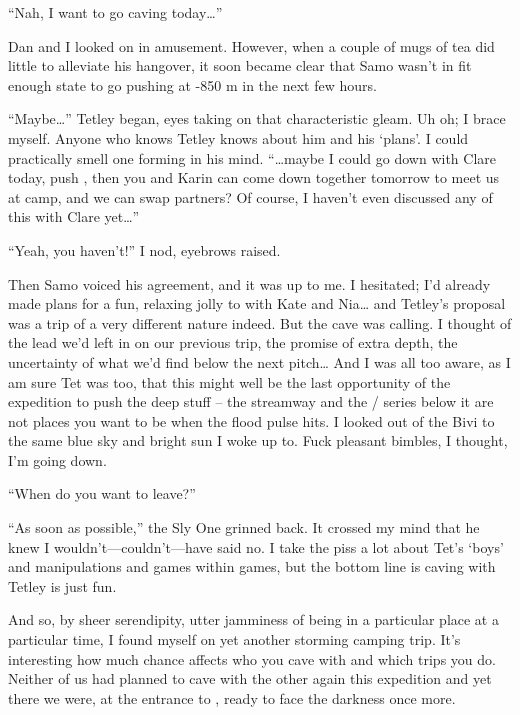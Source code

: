``Nah, I want to go caving today\ldots{}''

Dan and I looked on in amusement. However, when a couple of mugs of tea
did little to alleviate his hangover, it soon became clear that Samo
wasn't in fit enough state to go pushing at -850 m in the next few
hours.

``Maybe\ldots{}'' Tetley began, eyes taking on that characteristic
gleam. Uh oh; I brace myself. Anyone who knows Tetley knows about him
and his `plans'. I could practically smell one forming in his mind.
``\ldots{}maybe I could go down with Clare today, push
, then you and Karin can come down together tomorrow
to meet us at camp, and we can swap partners? Of course, I haven't even
discussed any of this with Clare yet\ldots{}''

``Yeah, you haven't!'' I nod, eyebrows raised.

Then Samo voiced his agreement, and it was up to me. I hesitated; I'd
already made plans for a fun, relaxing jolly to  with Kate
and Nia\ldots{} and Tetley's proposal was a trip of a very different
nature indeed. But the cave was calling. I thought of the lead we'd left
in  on our previous trip, the promise of extra depth,
the uncertainty of what we'd find below the next pitch\ldots{} And I was
all too aware, as I am sure Tet was too, that this might well be the
last opportunity of the expedition to push the deep stuff -- the
 streamway and the / series
below it are not places you want to be when the flood pulse hits. I
looked out of the Bivi to the same blue sky and bright sun I woke up to.
Fuck pleasant bimbles, I thought, I'm going down.

``When do you want to leave?''

``As soon as possible,'' the Sly One grinned back. It crossed my mind
that he knew I wouldn't---couldn't---have said no. I take the piss a lot
about Tet's `boys' and manipulations and games within games, but the
bottom line is caving with Tetley is just fun.

And so, by sheer serendipity, utter jamminess of being in a particular
place at a particular time, I found myself on yet another storming
camping trip. It's interesting how much chance affects who you cave with
and which trips you do. Neither of us had planned to cave with the other
again this expedition and yet there we were, at the entrance to
, ready to face the darkness once more.

